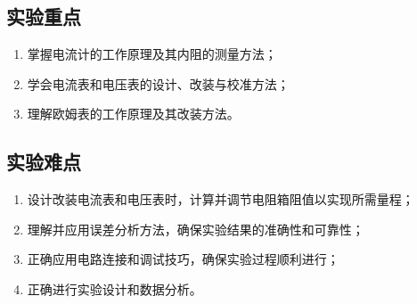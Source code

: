 \documentclass[]{../../templates/Report}
\begin{document}
\subsection{实验重点}
\begin{enumerate}
    \item 掌握电流计的工作原理及其内阻的测量方法；
    \item 学会电流表和电压表的设计、改装与校准方法；
    \item 理解欧姆表的工作原理及其改装方法。
\end{enumerate}
\subsection{实验难点}
\begin{enumerate}
    \item 设计改装电流表和电压表时，计算并调节电阻箱阻值以实现所需量程；
    \item 理解并应用误差分析方法，确保实验结果的准确性和可靠性；
    \item 正确应用电路连接和调试技巧，确保实验过程顺利进行；
    \item 正确进行实验设计和数据分析。
\end{enumerate}
\end{document}
